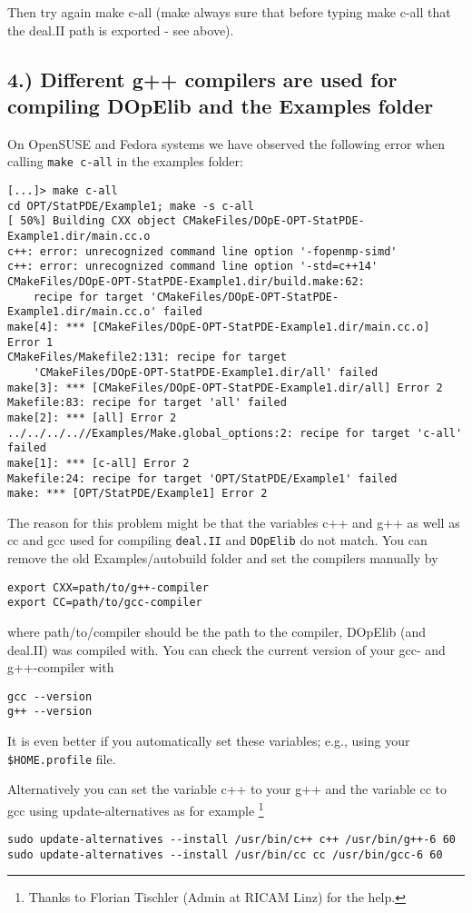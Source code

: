 Then try again make c-all (make always sure that before 
typing make c-all that the deal.II path is exported - see above). 

\subsection*{4.) Different g++ compilers are used for compiling
  DOpElib and the Examples folder}
On OpenSUSE and Fedora systems we have observed the following error 
when calling \texttt{make c-all} in the examples folder:
{\footnotesize
\begin{lstlisting}
[...]> make c-all
cd OPT/StatPDE/Example1; make -s c-all
[ 50%] Building CXX object CMakeFiles/DOpE-OPT-StatPDE-Example1.dir/main.cc.o
c++: error: unrecognized command line option '-fopenmp-simd'
c++: error: unrecognized command line option '-std=c++14'
CMakeFiles/DOpE-OPT-StatPDE-Example1.dir/build.make:62: 
    recipe for target 'CMakeFiles/DOpE-OPT-StatPDE-Example1.dir/main.cc.o' failed
make[4]: *** [CMakeFiles/DOpE-OPT-StatPDE-Example1.dir/main.cc.o] Error 1
CMakeFiles/Makefile2:131: recipe for target 
    'CMakeFiles/DOpE-OPT-StatPDE-Example1.dir/all' failed
make[3]: *** [CMakeFiles/DOpE-OPT-StatPDE-Example1.dir/all] Error 2
Makefile:83: recipe for target 'all' failed
make[2]: *** [all] Error 2
../../../..//Examples/Make.global_options:2: recipe for target 'c-all' failed
make[1]: *** [c-all] Error 2
Makefile:24: recipe for target 'OPT/StatPDE/Example1' failed
make: *** [OPT/StatPDE/Example1] Error 2
\end{lstlisting}
}

The reason for this problem might be that the variables c++ and g++ as
well as cc and gcc used for compiling \texttt{deal.II} and
\texttt{DOpElib} do not match.
\newline
You can remove the old Examples/autobuild folder and set the compilers manually by
\begin{lstlisting}
export CXX=path/to/g++-compiler
export CC=path/to/gcc-compiler
\end{lstlisting}
where path/to/compiler should be the path to the compiler, DOpElib
(and deal.II) was compiled with.
You can check the current version of your gcc- and g++-compiler with 
\begin{lstlisting}
gcc --version
g++ --version
\end{lstlisting}
It is even better if you automatically set these variables; e.g.,
using your \texttt{\${HOME}.profile} file.

Alternatively you can set the variable c++ to your g++ and the variable cc to gcc using update-alternatives
as for example
\footnote{Thanks to Florian Tischler (Admin at RICAM Linz) for the
  help.}
{\small
\begin{lstlisting}
sudo update-alternatives --install /usr/bin/c++ c++ /usr/bin/g++-6 60
sudo update-alternatives --install /usr/bin/cc cc /usr/bin/gcc-6 60
\end{lstlisting}}

